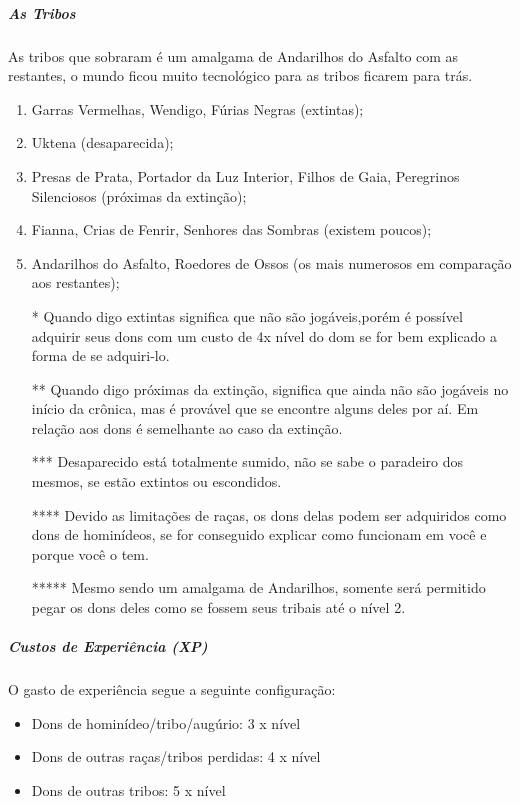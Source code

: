 \subparagraph{\bf As Tribos}
As tribos que sobraram é um amalgama de Andarilhos do Asfalto com as restantes, o mundo ficou muito tecnológico para as tribos ficarem para trás.
\begin{enumerate}
\item Garras Vermelhas, Wendigo, Fúrias Negras (extintas);
\item Uktena (desaparecida);
\item Presas de Prata, Portador da Luz Interior, Filhos de Gaia, Peregrinos Silenciosos (próximas da extinção);
\item Fianna, Crias de Fenrir, Senhores das Sombras (existem poucos);
\item Andarilhos do Asfalto, Roedores de Ossos (os mais numerosos em comparação aos restantes);

\item [*] Quando digo extintas significa que não são jogáveis,porém é possível adquirir seus dons com um custo de 4x nível do dom se for bem explicado a forma de se adquiri-lo.
\item [**] Quando digo próximas da extinção, significa que ainda não são jogáveis no início da crônica, mas é provável que se encontre alguns deles por aí. Em relação aos dons é semelhante ao caso da extinção.
\item [***] Desaparecido está totalmente sumido, não se sabe o paradeiro dos mesmos, se estão extintos ou escondidos. 
\item [****] Devido as limitações de raças, os dons delas podem ser adquiridos como dons de hominídeos, se for conseguido explicar como funcionam em você e porque você o tem.
\item [*****] Mesmo sendo um amalgama de Andarilhos, somente será permitido pegar os dons deles como se fossem seus tribais até o nível 2.
\end{enumerate}

\subparagraph{\bf Custos de Experiência (XP)}
O gasto de experiência segue a seguinte configuração:
\begin{itemize}
    \item Dons de hominídeo/tribo/augúrio: 3 x nível
    \item Dons de outras raças/tribos perdidas: 4 x nível
    \item Dons de outras tribos: 5 x nível
\end{itemize}
